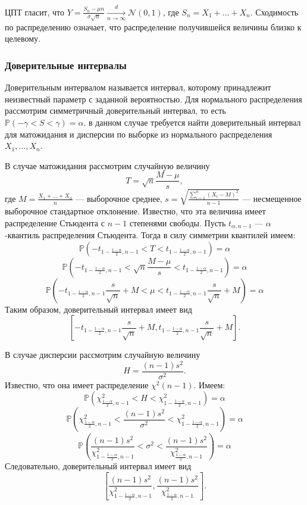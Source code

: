\documentclass{article}
\theoremstyle{definition}
\begin{document}
ЦПТ гласит, что $Y = \frac{S_n - \mu n}{\sigma \sqrt n} \xrightarrow[n \to \infty]{d} \mathcal{N}(0, 1)$, где $S_n = X_1 + \dots + X_n$. Сходимость по распределению означает, что распределение получившейся величины близко к целевому.

\subsubsection{Доверительные интервалы}

Доверительным интервалом называется интервал, которому принадлежит неизвестный параметр с заданной вероятностью. Для нормального распределения рассмотрим симметричный доверительный интервал, то есть $\mathbb P(-\gamma < S < \gamma) = \alpha$. в данном случае требуется найти доверительный интервал для матожидания и дисперсии по выборке из нормального распределения $X_1, \dots, X_n$.

В случае матожидания рассмотрим случайную величину
$$
    T = \sqrt n \frac{M - \mu}{s},
$$
где $M = \frac{X_1 + \dots + X_n}{n}$ --- выборочное среднее, $s = \sqrt{\frac{\sum_{i = 1}^n(X_i - M)^2}{n-1}}$ --- несмещенное выборочное стандартное отклонение. Известно, что эта величина имеет распределение Стьюдента с $n - 1$ степенями свободы. Пусть $t_{\alpha, n-1}$ --- $\alpha$-квантиль распределения Стьюдента. Тогда в силу симметрии квантилей имеем:
$$
    \mathbb{P}(-t_{1-\frac{1-\alpha}{2},n-1} < T < t_{1-\frac{1-\alpha}{2},n-1}) = \alpha
$$
$$
    \mathbb{P}(-t_{1-\frac{1-\alpha}{2},n-1} < \sqrt n \frac{M - \mu}{s} < t_{1-\frac{1-\alpha}{2},n-1}) = \alpha
$$
$$
    \mathbb{P}(-t_{1-\frac{1-\alpha}{2},n-1}\frac{s}{\sqrt n} + M < \mu < t_{1-\frac{1-\alpha}{2},n-1}\frac{s}{\sqrt n} + M) = \alpha
$$
Таким образом, доверительный интервал имеет вид
$$
    [-t_{1-\frac{1-\alpha}{2},n-1}\frac{s}{\sqrt n} + M, t_{1-\frac{1-\alpha}{2},n-1}\frac{s}{\sqrt n} + M].
$$

В случае дисперсии рассмотрим случайную величину
$$
    H = \frac{(n - 1)s^2}{\sigma^2}.
$$
Известно, что она имеет распределение $\chi^2(n - 1)$. Имеем:
$$
    \mathbb{P}(\chi^2_{\frac{1-\alpha}{2},n-1} < H < \chi^2_{1-\frac{1-\alpha}{2},n-1}) = \alpha
$$
$$
    \mathbb{P}(\chi^2_{\frac{1-\alpha}{2},n-1} < \frac{(n - 1)s^2}{\sigma^2} < \chi^2_{1-\frac{1-\alpha}{2},n-1}) = \alpha
$$
$$
    \mathbb{P}(\frac{(n-1)s^2}{\chi^2_{1-\frac{1-\alpha}{2},n-1}} < \sigma^2 < \frac{(n-1)s^2}{\chi^2_{\frac{1-\alpha}{2},n-1}}) = \alpha
$$
Следовательно, доверительный интервал имеет вид
$$
    [\frac{(n-1)s^2}{\chi^2_{1-\frac{1-\alpha}{2},n-1}}, \frac{(n-1)s^2}{\chi^2_{\frac{1-\alpha}{2},n-1}}].
$$
\end{document}
